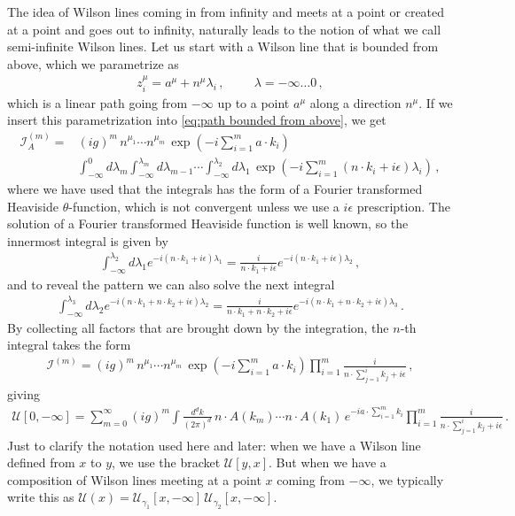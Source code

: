 The idea of Wilson lines coming in from infinity and meets at a point or created at a point and goes out to infinity, naturally leads to the notion of what we call semi-infinite Wilson lines. Let us start with a Wilson line that is bounded from above, which we parametrize as
\begin{align}
    z_{i}^{\mu}=a^{\mu}+n^{\mu}\lambda_{i}\,,\hspace{1cm}\lambda=-\infty\dots 0\,,
\end{align}
which is a linear path going from $-\infty$ up to a point $a^{\mu}$ along a direction $n^{\mu}$. If we insert this parametrization into \cref{eq:path bounded from above}, we get
\begin{align}
    \mathcal{I}_{A}^{(m)}=&(ig)^{m}\,n^{\mu_1}\cdots n^{\mu_m}\,\exp(-i\sum_{i=1}^{m}a\cdot k_i)\nonumber
    \\
    &\int_{-\infty}^{0}d\lambda_m\int_{-\infty}^{\lambda_{m}}d\lambda_{m-1}\cdots\int_{-\infty}^{\lambda_{2}}d\lambda_1 \,\exp(-i\sum_{i=1}^{m}(n\cdot k_{i}+i\epsilon)\lambda_{i})\,,
\end{align}
where we have used that the integrals has the form of a Fourier transformed Heaviside $\theta$-function, which is not convergent unless we use a $i\epsilon$ prescription. The solution of a Fourier transformed Heaviside function is well known, so the innermost integral is given by
\begin{align}
    \int_{-\infty}^{\lambda_{2}}d\lambda_{1}e^{-i(n\cdot k_1+i\epsilon)\lambda_1}=\frac{i}{n\cdot k_1+i\epsilon}e^{-i(n\cdot k_1+i\epsilon)\lambda_2}\,,
\end{align}
and to reveal the pattern we can also solve the next integral
\begin{align}
    \int_{-\infty}^{\lambda_{3}}d\lambda_{2}e^{-i(n\cdot k_1+n\cdot k_2+i\epsilon)\lambda_2}=\frac{i}{n\cdot k_1+n\cdot k_2+i\epsilon}e^{-i(n\cdot k_1+n\cdot k_2+i\epsilon)\lambda_3}\,.
\end{align}
By collecting all factors that are brought down by the integration, the $n$-th integral takes the form
\begin{align}
    \mathcal{I}^{(m)}=(ig)^{m}\,n^{\mu_1}\cdots n^{\mu_m}\,\exp(-i\sum_{i=1}^{m}a\cdot k_i)\prod_{i=1}^{m}\frac{i}{n\cdot\sum_{j=1}^{i} k_j+i\epsilon}\,,
\end{align}
giving
\begin{align}\label{eq:semi-infinite Wilson line -infty-to-0}
    \mathcal{U}[0,-\infty]=\sum_{m=0}^{\infty}(ig)^{m}\int\frac{d^{d}k}{(2\pi)^{d}}\,n\cdot A(k_m)\cdots n\cdot A(k_1)\,e^{-ia\cdot\sum_{i=1}^{m} k_i}\prod_{i=1}^{m}\frac{i}{n\cdot\sum_{j=1}^{i} k_j+i\epsilon}\,.
\end{align}
Just to clarify the notation used here and later: when we have a Wilson line defined from $x$ to $y$, we use the bracket $\mathcal{U}[y,x]$. But when we have a composition of Wilson lines meeting at a point $x$ coming from $-\infty$, we typically write this as $\mathcal{U}(x)=\mathcal{U}_{\gamma_1}[x,-\infty]\,\mathcal{U}_{\gamma_2}[x,-\infty]$.

